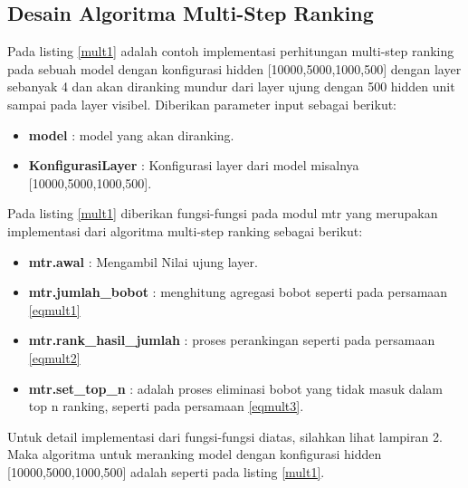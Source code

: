 \subsection{ Desain Algoritma Multi-Step Ranking }
Pada listing \ref{mult1} adalah contoh implementasi perhitungan multi-step ranking pada sebuah model dengan konfigurasi hidden [10000,5000,1000,500] dengan layer sebanyak 4 dan akan diranking mundur dari layer ujung dengan 500 hidden unit sampai pada layer visibel. Diberikan parameter input sebagai berikut:
\begin{itemize}
\item \textbf{model} : model yang akan diranking.
\item \textbf{KonfigurasiLayer} : Konfigurasi layer dari model misalnya [10000,5000,1000,500].
\end{itemize}

Pada listing \ref{mult1} diberikan fungsi-fungsi pada modul mtr yang merupakan implementasi dari algoritma multi-step ranking sebagai berikut:
\begin{itemize}
\item \textbf{mtr.awal} : Mengambil Nilai ujung layer.
\item \textbf{mtr.jumlah\_bobot} : menghitung agregasi bobot seperti pada persamaan \ref{eqmult1}
\item \textbf{mtr.rank\_hasil\_jumlah} : proses perankingan seperti pada persamaan \ref{eqmult2}
\item \textbf{mtr.set\_top\_n} : adalah proses eliminasi bobot yang tidak masuk dalam top n ranking, seperti pada persamaan \ref{eqmult3}.
\end{itemize}
Untuk detail implementasi dari fungsi-fungsi diatas, silahkan lihat lampiran 2. Maka algoritma untuk meranking model dengan konfigurasi hidden [10000,5000,1000,500] adalah seperti pada listing \ref{mult1}. 
\newpage
\lstset{language=python}          %
\lstset{
  numbers=left,
  firstnumber=1,
  numberfirstline=true
}

